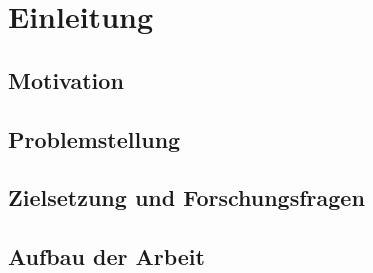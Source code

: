 \chapter{Einleitung}
\label{ch:einleitung}

\section{Motivation}
\label{sec:motivation}

\section{Problemstellung}
\label{sec:problemstellung}

\section{Zielsetzung und Forschungsfragen}
\label{sec:zielsetzung}

\section{Aufbau der Arbeit}
\label{sec:aufbau}
